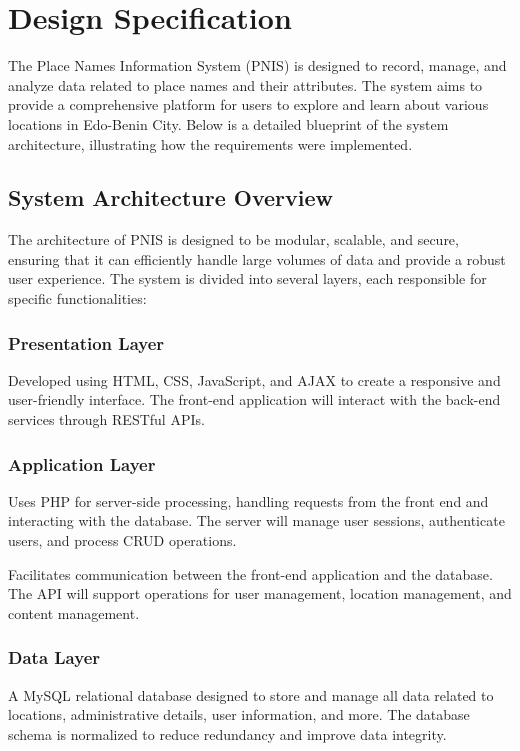 \section{Design Specification}
The Place Names Information System (PNIS) is designed to record, manage, and analyze data related to place names and their attributes. The system aims to provide a comprehensive platform for users to explore and learn about various locations in Edo-Benin City. Below is a detailed blueprint of the system architecture, illustrating how the requirements were implemented.

\subsection{System Architecture Overview}
The architecture of PNIS is designed to be modular, scalable, and secure, ensuring that it can efficiently handle large volumes of data and provide a robust user experience. The system is divided into several layers, each responsible for specific functionalities:

\subsubsection{Presentation Layer}
Developed using HTML, CSS, JavaScript, and AJAX to create a responsive and user-friendly interface. The front-end application will interact with the back-end services through RESTful APIs.

\subsubsection{Application Layer}
Uses PHP for server-side processing, handling requests from the front end and interacting with the database. The server will manage user sessions, authenticate users, and process CRUD operations.

Facilitates communication between the front-end application and the database. The API will support operations for user management, location management, and content management.

\subsubsection{Data Layer}
A MySQL relational database designed to store and manage all data related to locations, administrative details, user information, and more. The database schema is normalized to reduce redundancy and improve data integrity.

